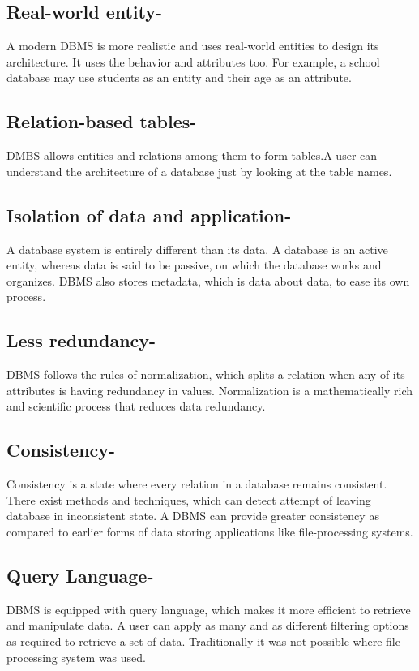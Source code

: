 \documentclass[11pt]{article}
\begin{document}
\subsection*{Real-world entity-} A modern DBMS is more realistic and uses real-world entities to design its architecture. It uses the behavior and attributes too. For example, a school database may use students as an entity and their age as an attribute.

\subsection*{Relation-based tables-} DMBS allows entities and relations among them to form tables.A user can understand the architecture of a database just by looking at the table names.\\
\subsection*{Isolation of data and application-} A database system is entirely different than its data. A database is an active entity, whereas data is said to be passive, on which the database works and organizes. DBMS also stores metadata, which is data about data, to ease its own process.\\
\subsection*{Less redundancy-}DBMS follows the rules of normalization, which splits a relation when any of its attributes is having redundancy in values. Normalization is a mathematically rich and scientific process that reduces data redundancy.\\

\subsection*{Consistency-}Consistency is a state where every relation in a database remains consistent. There exist methods and techniques, which can detect attempt of leaving database in inconsistent state. A DBMS can provide greater consistency as compared to earlier forms of data storing applications like file-processing systems.\\

\subsection*{Query Language-}DBMS is equipped with query language, which makes it more efficient to retrieve and manipulate data. A user can apply as many and as different filtering options as required to retrieve a set of data. Traditionally it was not possible where file-processing system was used.\\
\end{document}
